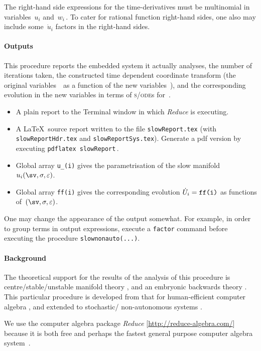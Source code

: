 \documentclass[11pt,a5paper]{article}
\def\eps{\ensuremath{\varepsilon}}
\def\sde{\textsc{s/ode}}
\begin{document}
The right-hand side expressions for the time-derivatives
must be multinomial in variables~$u_i$ and~$w_i$\,.  To
cater for rational function right-hand sides, one also may
include some~\(\dot u_i\) factors in the right-hand sides.


\paragraph{Outputs}  This procedure reports the embedded
system it actually analyses, the number of iterations taken,
the constructed time dependent coordinate transform (the
original variables~\uv\ as a function of the new
variables~\sv), and the corresponding evolution in the new
variables in terms of \sde{}s for~\sv.
\begin{itemize}
\item A plain report to the Terminal window in which
\emph{Reduce} is executing.

\item A \LaTeX\ source report written to the file
\verb|slowReport.tex| (with \verb|slowReportHdr.tex|
and \verb|slowReportSys.tex|). Generate a pdf version 
by executing \verb|pdflatex slowReport|\,.

\item Global array \verb|u_(i)| gives the parametrisation of
the slow manifold~\(u_i(\sv,\sigma,\eps)\).

\item Global array \verb|ff(i)| gives the corresponding
evolution \(\dot U_i=\verb|ff(i)|\)  as functions
of~\((\sv,\sigma,\eps)\).
\end{itemize}
One may change the appearance of the output somewhat. For
example, in order to group terms in output expressions,
execute a \verb|factor| command before executing the
procedure \verb|slownonauto(...)|.


\paragraph{Background}
The theoretical support for the results of the analysis of
this procedure is centre\slash stable\slash unstable
manifold theory \cite[e.g.,][]{Carr81, Knobloch82,
Haragus2011, Roberts2014a}, and an embryonic backwards
theory \cite[]{Roberts2018a}.  This particular procedure is
developed from that for human-efficient computer algebra
\cite[]{Roberts96a}, and extended to stochastic\slash
non-autonomous systems \cite[]{Chao95, Roberts06k}.

We use the computer algebra package \emph{Reduce} 
[\url{http://reduce-algebra.com/}] because it is both free 
and perhaps the fastest general purpose computer algebra 
system~\cite[e.g.]{Fateman2002}.
\end{document}
